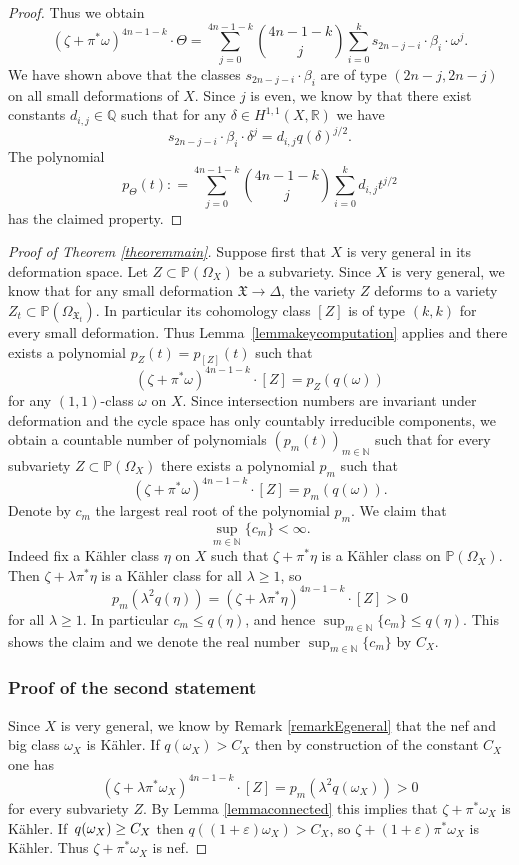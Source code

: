 \documentclass[11pt]{article}
\theoremstyle{plain}
\theoremstyle{definition}
\newcommand{\R}{\ensuremath{\mathbb{R}}}
\newcommand{\Q}{\ensuremath{\mathbb{Q}}}
\newcommand{\N}{\ensuremath{\mathbb{N}}}
\newcommand{\PP}{\ensuremath{\mathbb{P}}}
\begin{document}
\begin{proof}
Thus we obtain
\[
(\zeta+\pi^*\omega)^{4n-1-k} \cdot \Theta
=
\sum_{j=0}^{4n-1-k}
\binom{4n-1-k}{j}
\sum_{i=0}^{k} s_{2n-j-i} \cdot \beta_{i} \cdot \omega^j
.
\]
We have shown above that the classes $s_{2n-j-i} \cdot \beta_{i}$
are of type $(2n-j, 2n-j)$ on all small deformations of $X$.
Since $j$ is even, we know by \cite[Th.\,5.12]{Huy97} that there exist
constants $d_{i,j} \in \Q$ such that for any
$\delta\in H^{1,1}(X,\R)$ we have
\[
s_{2n-j-i} \cdot \beta_{i} \cdot \delta^j = d_{i,j} q(\delta)^{j/2}.
\]
The polynomial
\[
p_\Theta(t): = \sum_{j=0}^{4n-1-k}
\binom{4n-1-k}{j}
\sum_{i=0}^{k} d_{i,j} t^{j/2}
\]
has the claimed property.
\end{proof}

\begin{proof}[Proof of Theorem \ref{theoremmain}]
Suppose first that $X$ is very general in its deformation space.
Let $Z \subset \PP(\Omega_X)$ be a subvariety.
Since $X$ is very general, we know that
for any small deformation $\mathfrak X \to \Delta$, the variety $Z$ deforms
to a variety $Z_t \subset \PP(\Omega_{\mathfrak X_t})$.
In particular its cohomology class $[Z]$ is of type $(k,k)$ for every small deformation.
Thus Lemma~\ref{lemmakeycomputation} applies and there exists a polynomial $p_Z(t)=p_{[Z]}(t)$ such that
\[
(\zeta + \pi^* \omega)^{4n-1-k} \cdot [Z] = p_Z(q(\omega))
\]
for any $(1,1)$-class $\omega$ on $X$. Since intersection numbers are invariant under deformation and the cycle space
has only countably irreducible components, we obtain a countable number of polynomials
$(p_m(t))_{m \in \N}$ such that for every subvariety $Z \subset \PP(\Omega_X)$ there exists a polynomial $p_m$
such that
\[
(\zeta + \pi^* \omega)^{4n-1-k} \cdot [Z] = p_m(q(\omega)).
\]
Denote by $c_m$ the largest real root of the polynomial $p_m$. We claim that
\[
\sup_{m \in \N} \{ c_m \} < \infty.
\]
Indeed fix a Kähler class $\eta$ on $X$ such that $\zeta+\pi^*\eta$ is a Kähler class on $\PP(\Omega_X)$. Then $\zeta+ \lambda \pi^*\eta$ is a Kähler class for all $\lambda \geq 1$, so
\[
p_m(\lambda^2 q(\eta)) = (\zeta + \lambda \pi^* \eta)^{4n-1-k} \cdot [Z] > 0
\]
for all $\lambda \geq 1$. In particular $c_m \leq q(\eta)$, and hence $\sup_{m \in \N} \{ c_m \} \leq q(\eta)$.
This shows the claim and we denote the real number $\sup_{m \in \N} \{ c_m \}$ by $C_X$.

\subsubsection*{Proof of the second statement}
Since $X$ is very general, we know by Remark \ref{remarkEgeneral} that the nef and big class $\omega_X$ is Kähler.
If $q(\omega_X) > C_X$ then by construction of the constant $C_X$ one has
\[
(\zeta + \lambda \pi^* \omega_X)^{4n-1-k} \cdot [Z] = p_m(\lambda^2 q(\omega_X)) > 0
\]
for every subvariety $Z$. By Lemma \ref{lemmaconnected} this implies that $\zeta+\pi^* \omega_X$ is Kähler.
If~$q(\omega_X) \geq\nobreak C_X$ then $q((1+\varepsilon) \omega_X) > C_X$, so $\zeta+(1+\varepsilon) \pi^* \omega_X$ is Kähler.
Thus $\zeta+\pi^* \omega_X$ is nef.


\end{proof}
\end{document}
